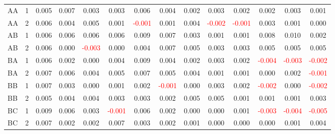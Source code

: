 \begin{table}[H]
{\begin{tabular}{llcccccccccccc}
AA & 1 & 0.005 & 0.007 & 0.003 & 0.003 & 0.006 & 0.004 & 0.002 & 0.003 & 0.002 & 0.002 & 0.003 & 0.001\\
AA & 2 & 0.006 & 0.004 & 0.005 & 0.001 & \textcolor{red}{-0.001} & 0.001 & 0.004 & \textcolor{red}{-0.002} & \textcolor{red}{-0.001} & 0.003 & 0.001 & 0.000\\
AB & 1 & 0.006 & 0.006 & 0.006 & 0.006 & 0.009 & 0.007 & 0.003 & 0.001 & 0.001 & 0.008 & 0.010 & 0.002\\
AB & 2 & 0.006 & 0.000 & \textcolor{red}{-0.003} & 0.000 & 0.004 & 0.007 & 0.005 & 0.003 & 0.003 & 0.005 & 0.005 & 0.005\\
BA & 1 & 0.006 & 0.002 & 0.000 & 0.004 & 0.009 & 0.004 & 0.002 & 0.003 & 0.002 & \textcolor{red}{-0.004} & \textcolor{red}{-0.003} & \textcolor{red}{-0.002}\\
BA & 2 & 0.007 & 0.006 & 0.004 & 0.005 & 0.007 & 0.005 & 0.004 & 0.001 & 0.001 & 0.000 & 0.002 & \textcolor{red}{-0.001}\\
BB & 1 & 0.007 & 0.003 & 0.000 & 0.001 & 0.002 & \textcolor{red}{-0.001} & 0.000 & 0.003 & 0.002 & \textcolor{red}{-0.002} & 0.000 & \textcolor{red}{-0.002}\\
BB & 2 & 0.005 & 0.004 & 0.004 & 0.003 & 0.003 & 0.002 & 0.005 & 0.005 & 0.001 & 0.001 & 0.001 & 0.003\\
BC & 1 & 0.009 & 0.006 & 0.003 & \textcolor{red}{-0.001} & 0.006 & 0.002 & 0.000 & 0.000 & 0.001 & \textcolor{red}{-0.003} & \textcolor{red}{-0.004} & \textcolor{red}{-0.005}\\
BC & 2 & 0.007 & 0.002 & 0.002 & 0.007 & 0.003 & 0.002 & 0.001 & 0.000 & 0.000 & 0.000 & 0.001 & 0.004\\
\hline
    \end{tabular}%
    }
    \label{tab:cen5_uni}
\end{table}


